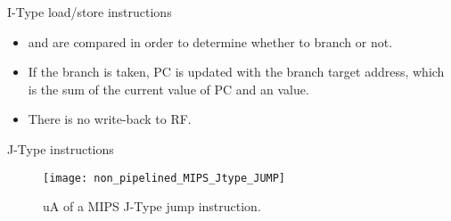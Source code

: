%
\begin{frame}{I-Type load/store instructions}
\begin{itemize}
\item {} and  are compared in order to determine whether to branch or not.
\item If the branch is taken, \ac{PC} is updated with the branch target address, which is the sum of the current value of \ac{PC} and an  value.
\item There is no write-back to \ac{RF}.
\end{itemize}
\end{frame}

% 
\begin{frame}{J-Type instructions}
  \begin{figure}
  \centering
  \texttt{[image: non\_pipelined\_MIPS\_Jtype\_JUMP]}
  \vspace{-3pt}
  \caption{\ac{uA} of a \ac{MIPS} J-Type jump instruction.}
  \label{Figure:non_pipelined_MIPS_Jtype_JUMP}
  \end{figure}
\end{frame}